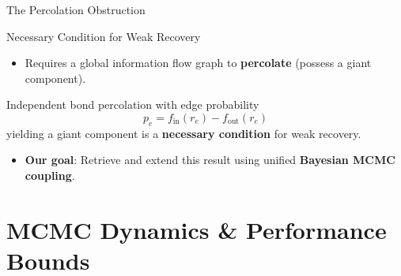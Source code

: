 \documentclass[A4,svgnames,9pt,aspectratio=169]{beamer}
\begin{document}
\begin{frame}{The Percolation Obstruction}
  \begin{block}{Necessary Condition for Weak Recovery \cite{SankararamanBaccelli2018}}
    \begin{itemize}
      \item Requires a global information flow graph to \textbf{percolate} \cite{penrose2003} (possess a giant component).
    \end{itemize}
  \end{block}
  \begin{theorem}
    Independent bond percolation with edge probability
    \begin{equation*}
        p_e = f_{\mathrm{in}}(r_e) - f_{\mathrm{out}}(r_e)
    \end{equation*}
    yielding a giant component is a \textbf{necessary condition} for weak recovery.
  \end{theorem}
  \begin{itemize}
    \item \textbf{Our goal}: Retrieve and extend this result using unified \textbf{Bayesian MCMC coupling}.
  \end{itemize}
\end{frame}

\section{MCMC Dynamics \& Performance Bounds}
\frame{\sectionpage}
\end{document}
